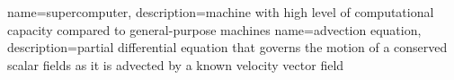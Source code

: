 

{
	name={supercomputer},
	description={machine with high level of computational capacity compared to general-purpose machines}
}
{
	name={advection equation},
	description={partial differential equation that governs the motion of a conserved scalar fields as it is advected by a known velocity vector field}
}
